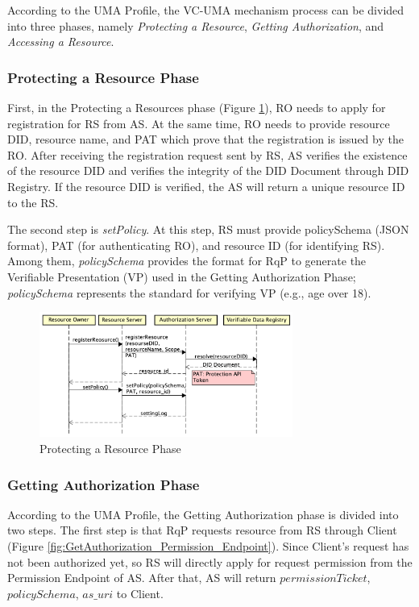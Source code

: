 \documentclass[conference, dvipdfmx]{IEEEtran} %
\begin{document}
\begin{sloppypar}
According to the UMA Profile\cite{UMA}, the VC-UMA mechanism process can be divided into three phases, namely \textit{Protecting a Resource}, \textit{Getting Authorization}, and \textit{Accessing a Resource}.

\subsubsection{Protecting a Resource Phase}

First, in the Protecting a Resources phase (Figure \ref{fig:ProtectResource}), RO needs to apply for registration for RS from AS.
At the same time, RO needs to provide resource DID, resource name, and PAT which prove that the registration is issued by the RO. 
After receiving the registration request sent by RS, AS verifies the existence of the resource DID and verifies the integrity of the DID Document through DID Registry. If the resource DID is verified, the AS will return a unique resource ID to the RS.

The second step is \textit{setPolicy}. At this step, RS must provide policySchema (JSON format), PAT (for authenticating RO), and resource ID (for identifying RS).
Among them, \textit{policySchema} provides the format for RqP to generate the Verifiable Presentation (VP) used in the Getting Authorization Phase; \textit{policySchema} represents the standard for verifying VP (e.g., age over 18).

\begin{figure}[htbp] %
  \begin{center} %
  \includegraphics[width=83mm]{images/ProtectResource.png} %
  \caption{Protecting a Resource Phase} %
  \label{fig:ProtectResource} %
  \end{center}
\end{figure}


\subsubsection{Getting Authorization Phase}
According to the UMA Profile, the Getting Authorization phase is divided into two steps. The first step is that RqP requests resource from RS through Client (Figure \ref{fig:GetAuthorization_Permission_Endpoint}). Since Client's request has not been authorized yet, so RS will directly apply for request permission from the Permission Endpoint of AS. After that, AS will return $permission Ticket$, $policySchema$, $as\_uri$ to Client.


\end{sloppypar}
\end{document}
